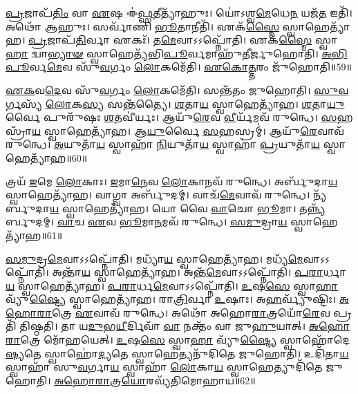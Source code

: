 \-\ul{𑌪𑍍𑌰}\-𑌜𑌾𑌪᳴\-\ul{𑌤𑌿𑌂} 𑌵𑌾 \ul{𑌏}\-𑌷 𑌈॑\-\ul{𑌫𑍍𑌸}\-𑌤𑍀𑌤𑍍𑌯𑌾᳴𑌹𑍁𑌃।
𑌯𑍋॑𑌽𑌶𑍍𑌵\-\ul{𑌮𑍇}\-𑌧𑍇\-\ul{𑌨} 𑌯𑌜᳴\-\ul{𑌤} 𑌇𑌤𑌿᳴।
𑌅𑌥𑍋᳴ 𑌆𑌹𑍁𑌃।
𑌸𑌰𑍍𑌵𑌾᳴𑌣𑌿 \ul{𑌭𑍂}\-𑌤𑌾𑌨𑍀𑌤𑌿᳴।
𑌏𑌕᳴\-\ul{𑌸𑍍𑌮𑍈} 𑌸𑍍𑌵𑌾𑌹𑍇𑌤𑍍𑌯𑌾᳴𑌹।
\-\ul{𑌪𑍍𑌰}\-𑌜𑌾𑌪᳴\-\ul{𑌤𑌿}\-𑌰𑍍𑌵𑌾 𑌏𑌕𑌃᳴।
𑌤\-\ul{𑌮𑍇}\-𑌵𑌾𑌽𑌽𑌪𑍍𑌨𑍋᳴𑌤𑌿।
𑌏𑌕᳴\-\ul{𑌸𑍍𑌮𑍈} 𑌸𑍍𑌵𑌾\-\ul{𑌹𑌾} 𑌦𑍍𑌵𑌾\-\ul{𑌭𑍍𑌯𑌾}\-\-\ul{𑍟} 𑌸𑍍𑌵𑌾𑌹𑍇𑌤𑍍𑌯᳴𑌭𑌿\-\ul{𑌪𑍂}\-𑌰𑍍𑌵𑌮𑌾𑌹𑍁᳴𑌤𑍀𑌰𑍍𑌜𑍁𑌹𑍋𑌤𑌿।
\-\ul{𑌅}\-\-\ul{𑌭𑌿}\-\-\ul{𑌪𑍂}\-𑌰𑍍𑌵\-\ul{𑌮𑍇}\-𑌵 𑌸𑍁᳴\-\ul{𑌵}\-𑌰𑍍𑌗𑌂 \ul{𑌲𑍋}\-𑌕𑌮𑍇᳴𑌤𑌿।
\-\ul{𑌏}\-\-\ul{𑌕𑍋}\-\-\ul{𑌤𑍍𑌤}\-𑌰𑌂 𑌜𑍁᳴𑌹𑍋𑌤𑌿॥59॥

\-\ul{𑌏}\-\-\ul{𑌕}\-𑌵\-\ul{𑌦𑍇}\-𑌵 𑌸𑍁᳴\-\ul{𑌵}\-𑌰𑍍𑌗𑌂 \ul{𑌲𑍋}\-𑌕𑌮𑍇᳴𑌤𑌿।
𑌸𑌨𑍍𑌤᳴𑌤𑌂 𑌜𑍁𑌹𑍋𑌤𑌿।
\-\ul{𑌸𑍁}\-\-\ul{𑌵}\-𑌰𑍍𑌗𑌸𑍍𑌯᳴ \ul{𑌲𑍋}\-𑌕\-\ul{𑌸𑍍𑌯} 𑌸𑌨𑍍𑌤᳴𑌤𑍍𑌯𑍈।
\-\ul{𑌶}\-𑌤𑌾\-\ul{𑌯} 𑌸𑍍𑌵𑌾𑌹𑍇𑌤𑍍𑌯𑌾᳴𑌹।
\-\ul{𑌶}\-𑌤𑌾\-\ul{𑌯𑍁}\-𑌰𑍍𑌵𑍈 𑌪𑍁𑌰𑍁᳴𑌷𑌃 \ul{𑌶}\-𑌤𑌵𑍀॑𑌰𑍍𑌯𑌃।
𑌆𑌯𑍁᳴\-\ul{𑌰𑍇}\-𑌵 \ul{𑌵𑍀}\-𑌰𑍍𑌯᳴𑌮𑌵᳴ 𑌰𑍁𑌨𑍍𑌧𑍇।
\-\ul{𑌸}\-𑌹𑌸𑍍𑌰𑌾᳴\-\ul{𑌯} 𑌸𑍍𑌵𑌾𑌹𑍇𑌤𑍍𑌯𑌾᳴𑌹।
𑌆\-\ul{𑌯𑍁}\-𑌰𑍍𑌵𑍈 \ul{𑌸}\-𑌹𑌸𑍍𑌰𑌮𑍍॑।
𑌆𑌯𑍁᳴\-\ul{𑌰𑍇}\-𑌵𑌾𑌵᳴ 𑌰𑍁𑌨𑍍𑌧𑍇।
\-\ul{𑌅}\-𑌯𑍁𑌤𑌾᳴\-\ul{𑌯} 𑌸𑍍𑌵𑌾𑌹𑌾᳴ \ul{𑌨𑌿}\-𑌯𑍁𑌤𑌾᳴\-\ul{𑌯} 𑌸𑍍𑌵𑌾𑌹𑌾॑ \ul{𑌪𑍍𑌰}\-𑌯𑍁𑌤𑌾᳴\-\ul{𑌯} 𑌸𑍍𑌵𑌾𑌹𑍇𑌤𑍍𑌯𑌾᳴𑌹॥60॥

𑌤𑍍𑌰𑌯᳴ \ul{𑌇}\-𑌮𑍇 \ul{𑌲𑍋}\-𑌕𑌾𑌃।
\-\ul{𑌇}\-𑌮𑌾\-\ul{𑌨𑍇}\-𑌵 \ul{𑌲𑍋}\-𑌕𑌾𑌨𑌵᳴ 𑌰𑍁𑌨𑍍𑌧𑍇।
𑌅𑌰𑍍𑌬𑍁᳴𑌦𑌾\-\ul{𑌯} 𑌸𑍍𑌵𑌾𑌹𑍇𑌤𑍍𑌯𑌾᳴𑌹।
𑌵𑌾𑌗𑍍𑌵𑌾 𑌅𑌰𑍍𑌬𑍁᳴𑌦𑌮𑍍।
𑌵𑌾𑌚᳴\-\ul{𑌮𑍇}\-𑌵𑌾𑌵᳴ 𑌰𑍁𑌨𑍍𑌧𑍇।
𑌨𑍍𑌯᳴𑌰𑍍𑌬𑍁𑌦𑌾\-\ul{𑌯} 𑌸𑍍𑌵𑌾𑌹𑍇𑌤𑍍𑌯𑌾᳴𑌹।
𑌯𑍋 𑌵𑍈 \ul{𑌵𑌾}\-𑌚𑍋 \ul{𑌭𑍂}\-𑌮𑌾।
𑌤𑌨𑍍𑌨𑍍𑌯᳴𑌰𑍍𑌬𑍁𑌦𑌮𑍍।
\-\ul{𑌵𑌾}\-𑌚 \ul{𑌏}\-𑌵 \ul{𑌭𑍂}\-𑌮𑌾\-\ul{𑌨}\-𑌮𑌵᳴ 𑌰𑍁𑌨𑍍𑌧𑍇।
\-\ul{𑌸}\-\-\ul{𑌮𑍁}\-𑌦𑍍𑌰𑌾\-\ul{𑌯} 𑌸𑍍𑌵𑌾𑌹𑍇𑌤𑍍𑌯𑌾᳴𑌹॥61॥

\-\ul{𑌸}\-\-\ul{𑌮𑍁}\-𑌦𑍍𑌰\-\ul{𑌮𑍇}\-𑌵𑌾𑌽𑌽𑌪𑍍𑌨𑍋᳴𑌤𑌿।
𑌮𑌧𑍍𑌯𑌾᳴\-\ul{𑌯} 𑌸𑍍𑌵𑌾𑌹𑍇𑌤𑍍𑌯𑌾᳴𑌹।
𑌮𑌧𑍍𑌯᳴\-\ul{𑌮𑍇}\-𑌵𑌾𑌽𑌽𑌪𑍍𑌨𑍋᳴𑌤𑌿।
𑌅𑌨𑍍𑌤𑌾᳴\-\ul{𑌯} 𑌸𑍍𑌵𑌾𑌹𑍇𑌤𑍍𑌯𑌾᳴𑌹।
𑌅𑌨𑍍𑌤᳴\-\ul{𑌮𑍇}\-𑌵𑌾𑌽𑌽𑌪𑍍𑌨𑍋᳴𑌤𑌿।
\-\ul{𑌪}\-\-\ul{𑌰𑌾}\-𑌰𑍍𑌧𑌾\-\ul{𑌯} 𑌸𑍍𑌵𑌾𑌹𑍇𑌤𑍍𑌯𑌾᳴𑌹।
\-\ul{𑌪}\-\-\ul{𑌰𑌾}\-𑌰𑍍𑌧\-\ul{𑌮𑍇}\-𑌵𑌾𑌽𑌽𑌪𑍍𑌨𑍋᳴𑌤𑌿।
\-\ul{𑌉}\-𑌷\-\ul{𑌸𑍇} 𑌸𑍍𑌵𑌾\-\ul{𑌹𑌾} 𑌵𑍍𑌯𑍁᳴\-\ul{𑌷𑍍𑌟𑍍𑌯𑍈} 𑌸𑍍𑌵𑌾𑌹𑍇𑌤𑍍𑌯𑌾᳴𑌹।
𑌰𑌾\-\ul{𑌤𑍍𑌰𑌿}\-𑌰𑍍𑌵𑌾 \ul{𑌉}\-𑌷𑌾𑌃।
𑌅\-\ul{𑌹}\-𑌰𑍍𑌵𑍍𑌯𑍁᳴𑌷𑍍𑌟𑌿𑌃।
\-\ul{𑌅}\-\-\ul{𑌹𑍋}\-\-\ul{𑌰𑌾}\-𑌤𑍍𑌰𑍇 \ul{𑌏}\-𑌵𑌾𑌵᳴ 𑌰𑍁𑌨𑍍𑌧𑍇।
𑌅𑌥𑍋᳴ 𑌅𑌹𑍋\-\ul{𑌰𑌾}\-𑌤𑍍𑌰𑌯𑍋᳴\-\ul{𑌰𑍇}\-𑌵 𑌪𑍍𑌰𑌤𑌿᳴ 𑌤𑌿𑌷𑍍𑌠𑌤𑌿।
𑌤𑌾 𑌯\-\ul{𑌦𑍁}\-𑌭\-\ul{𑌯𑍀}\-𑌰𑍍𑌦𑌿𑌵𑌾᳴ \ul{𑌵𑌾} 𑌨𑌕𑍍𑌤𑌂᳴ 𑌵𑌾 𑌜𑍁\-\ul{𑌹𑍁}\-𑌯𑌾𑌤𑍍।
\-\ul{𑌅}\-\-\ul{𑌹𑍋}\-\-\ul{𑌰𑌾}\-𑌤𑍍𑌰𑍇 𑌮𑍋᳴𑌹𑌯𑍇𑌤𑍍।
\-\ul{𑌉}\-𑌷\-\ul{𑌸𑍇} 𑌸𑍍𑌵𑌾\-\ul{𑌹𑌾} 𑌵𑍍𑌯𑍁᳴\-\ul{𑌷𑍍𑌟𑍍𑌯𑍈} 𑌸𑍍𑌵𑌾𑌹𑍋᳴𑌦𑍇\-\ul{𑌷𑍍𑌯}\-𑌤𑍇 𑌸𑍍𑌵𑌾𑌹𑍋॑\-\ul{𑌦𑍍𑌯}\-𑌤𑍇 𑌸𑍍𑌵𑌾𑌹𑍇𑌤𑍍𑌯𑌨𑍁᳴𑌦𑌿𑌤𑍇 𑌜𑍁𑌹𑍋𑌤𑌿।
𑌉𑌦𑌿᳴𑌤𑌾\-\ul{𑌯} 𑌸𑍍𑌵𑌾𑌹𑌾᳴ 𑌸𑍁\-\ul{𑌵}\-𑌰𑍍𑌗𑌾\-\ul{𑌯} 𑌸𑍍𑌵𑌾𑌹𑌾᳴ \ul{𑌲𑍋}\-𑌕𑌾\-\ul{𑌯} 𑌸𑍍𑌵𑌾𑌹𑍇𑌤𑍍𑌯𑍁𑌦𑌿᳴𑌤𑍇 𑌜𑍁𑌹𑍋𑌤𑌿।
\-\ul{𑌅}\-\-\ul{𑌹𑍋}\-\-\ul{𑌰𑌾}\-𑌤𑍍𑌰\-\ul{𑌯𑍋}\-𑌰𑌵𑍍𑌯᳴𑌤𑌿𑌮𑍋𑌹𑌾𑌯॥62॥\anuvakamend[\-\ul{𑌏}\-\-\ul{𑌕𑍋}\-\-\ul{𑌤𑍍𑌤}\-𑌰𑌂 𑌜𑍁᳴𑌹𑍋𑌤𑌿 \ul{𑌪𑍍𑌰}\-𑌯𑍁𑌤𑌾᳴\-\ul{𑌯} 𑌸𑍍𑌵𑌾𑌹𑍇𑌤𑍍𑌯𑌾᳴𑌹 𑌸\-\ul{𑌮𑍁}\-𑌦𑍍𑌰𑌾\-\ul{𑌯} 𑌸𑍍𑌵𑌾𑌹𑍇\-\ul{𑌤𑍍𑌯𑌾}\-𑌹𑌾\-\ul{𑌹}\-𑌰𑍍𑌵𑍍𑌯𑍁᳴𑌷𑍍𑌟𑌿𑌃 \ul{𑌸}\-𑌪𑍍𑌤 𑌚᳴]

